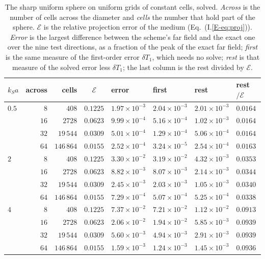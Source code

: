 \documentclass[11pt,a4paper]{article}
\newcommand{\cE}{\mathcal{E}}
\begin{document}
\begin{table}[htbp]
\centering
\caption{The sharp uniform sphere on uniform grids of constant cells, solved. \emph{Across} is the
number of cells across the diameter and \emph{cells} the number that hold part of the sphere. $\cE$ is
the relative projection error of the medium (Eq.~(I.\ref{E-eq:proj})). \emph{Error} is the largest
difference between the scheme's far field and the exact one over the nine test directions, as a
fraction of the peak of the exact far field; \emph{first} is the same measure of the first-order error
$\delta T_1$, which needs no solve; \emph{rest} is that measure of the solved error less $\delta T_1$;
the last column is the rest divided by $\cE$.}\label{tab:sharpsolved}
\small
\begin{tabular}{@{}lrrcllll@{}}
\toprule
$k_Sa$ & across & cells & $\cE$ & error & first & rest & rest$/\cE$ \\
\midrule
$0.5$ & $8$  & $408$      & $0.1225$ & $1.97\times10^{-3}$ & $2.04\times10^{-3}$ & $2.01\times10^{-3}$ & $0.0164$ \\
      & $16$ & $2728$     & $0.0623$ & $9.99\times10^{-4}$ & $5.16\times10^{-4}$ & $1.02\times10^{-3}$ & $0.0164$ \\
      & $32$ & $19\,544$  & $0.0309$ & $5.01\times10^{-4}$ & $1.29\times10^{-4}$ & $5.06\times10^{-4}$ & $0.0164$ \\
      & $64$ & $146\,864$ & $0.0155$ & $2.52\times10^{-4}$ & $3.24\times10^{-5}$ & $2.54\times10^{-4}$ & $0.0163$ \\
\midrule
$2$   & $8$  & $408$      & $0.1225$ & $3.30\times10^{-2}$ & $3.19\times10^{-2}$ & $4.32\times10^{-3}$ & $0.0353$ \\
      & $16$ & $2728$     & $0.0623$ & $8.82\times10^{-3}$ & $8.07\times10^{-3}$ & $2.14\times10^{-3}$ & $0.0344$ \\
      & $32$ & $19\,544$  & $0.0309$ & $2.45\times10^{-3}$ & $2.03\times10^{-3}$ & $1.05\times10^{-3}$ & $0.0340$ \\
      & $64$ & $146\,864$ & $0.0155$ & $7.29\times10^{-4}$ & $5.07\times10^{-4}$ & $5.25\times10^{-4}$ & $0.0338$ \\
\midrule
$4$   & $8$  & $408$      & $0.1225$ & $7.37\times10^{-2}$ & $7.21\times10^{-2}$ & $1.12\times10^{-2}$ & $0.0913$ \\
      & $16$ & $2728$     & $0.0623$ & $2.06\times10^{-2}$ & $1.94\times10^{-2}$ & $5.85\times10^{-3}$ & $0.0939$ \\
      & $32$ & $19\,544$  & $0.0309$ & $5.60\times10^{-3}$ & $4.94\times10^{-3}$ & $2.91\times10^{-3}$ & $0.0939$ \\
      & $64$ & $146\,864$ & $0.0155$ & $1.59\times10^{-3}$ & $1.24\times10^{-3}$ & $1.45\times10^{-3}$ & $0.0936$ \\
\bottomrule
\end{tabular}
\end{table}
\end{document}
